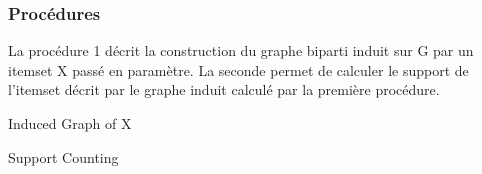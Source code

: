 \documentclass[a4paper,10pt]{report}
\begin{document}
\subsubsection{Procédures}

	La procédure 1 décrit la construction du graphe biparti induit sur G par un itemset X passé en paramètre. La seconde permet de calculer le support de l'itemset décrit par le graphe induit calculé par la première procédure.
\begin{algorithm}[H]
\caption{Induced Graph of X}


\end{algorithm}


\begin{algorithm}[H]
\caption{Support Counting}


\end{algorithm}



\end{document}
